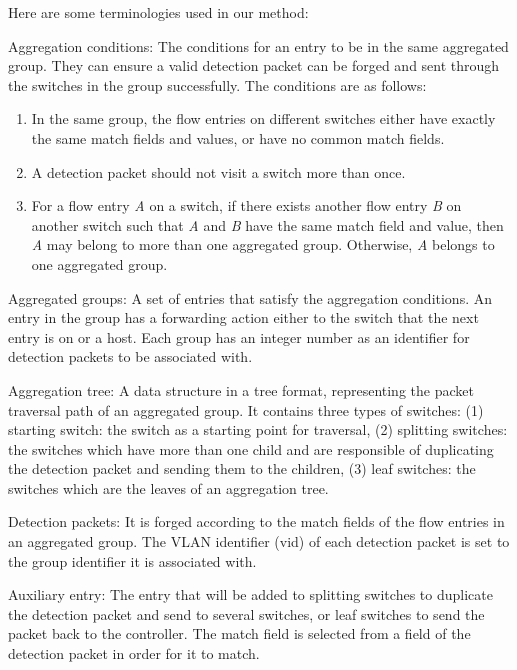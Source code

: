 \documentclass[conference]{IEEEtran}
\begin{document}
Here are some terminologies used in our method:
\begin{description}
\item
Aggregation conditions: The conditions for an entry to be in the same aggregated group. They can ensure a valid detection packet can be forged and sent through the switches in the group successfully. The conditions are as follows:
\begin{enumerate}
\item
In the same group, the flow entries on different switches either have exactly the same match fields and values, or have no common match fields.
\item
A detection packet should not visit a switch more than once.
\item
For a flow entry \textit{A} on a switch, if there exists another flow entry \textit{B} on another switch such that \textit{A} and \textit{B} have the same match field and value, then \textit{A} may belong to more than one aggregated group. Otherwise, \textit{A} belongs to one aggregated group.
\end{enumerate}

\item
Aggregated groups: A set of entries that satisfy the aggregation conditions. An entry in the group has a forwarding action either to the switch that the next entry is on or a host. Each group has an integer number as an identifier for detection packets to be associated with.

\item 
Aggregation tree: A data structure in a tree format, representing the packet traversal path of an aggregated group. It contains three types of switches: (1) starting switch: the switch as a starting point for traversal, (2) splitting switches: the switches which have more than one child and are responsible of duplicating the detection packet and sending them to the children, (3) leaf switches: the switches which are the leaves of an aggregation tree.

\item
Detection packets: It is forged according to the match fields of the flow entries in an aggregated group. The VLAN identifier (vid) of each detection packet is set to the group identifier it is associated with.

\item 
Auxiliary entry: The entry that will be added to splitting switches to duplicate the detection packet and send to several switches, or leaf switches to send the packet back to the controller. The match field is selected from a field of the detection packet in order for it to match.
\end{description}
\end{document}
